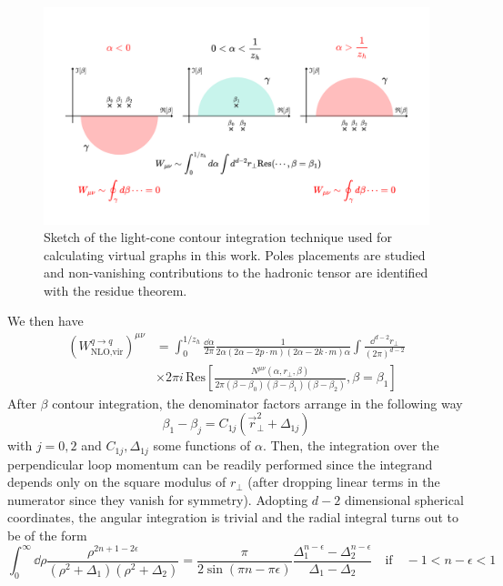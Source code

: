 \begin{figure}
    \centering
    \includegraphics[width=0.99\linewidth]{fig/beta contour.pdf}
    \caption{Sketch of the light-cone contour integration technique used for calculating virtual graphs in this work. Poles placements are studied and non-vanishing contributions to the hadronic tensor are identified with the residue theorem.}
    \label{fig:beta contour}
\end{figure}
We then have
\begin{equation}
\begin{aligned}
       (W^{q \to q}_{\text{NLO,vir}})^{\mu\nu} &=\int_0^{1/z_h}\frac{\dd \alpha}{2\pi} \frac{1}{2\alpha(2\alpha-2p \cdot m)(2\alpha-2 k \cdot m)\alpha}\int \frac{\dd^{d-2}r_\perp}{(2\pi)^{d-2}}\\
       &\times 2\pi i\,\mathrm{Res}\left[\frac{N^{\mu\nu}(\alpha,r_\perp,\beta)}{2\pi(\beta-\beta_0)(\beta-\beta_1)(\beta-\beta_2)},\beta=\beta_1\right]
\end{aligned}
\end{equation}
After $\beta$ contour integration, the denominator factors arrange in the following way
\begin{equation}\label{eq:betaimbetaj=C(rt2+Del)}
    \beta_1-\beta_j=C_{1j}(\vec r_\perp^2+\Delta_{1j})
\end{equation}
with $j=0,2$ and $C_{1j},\Delta_{1j}$ some functions of $\alpha$. Then, the integration over the perpendicular loop momentum can be readily performed since the integrand depends only on the square modulus of $r_\perp$ (after dropping linear terms in the numerator since they vanish for symmetry). Adopting $d-2$ dimensional spherical coordinates, the angular integration is trivial and the radial integral turns out to be of the form
\begin{equation}
    \int_0^\infty \dd \rho \frac{ \rho^{2n+1-2\epsilon}}{(\rho^2+\Delta_1)(\rho^2+\Delta_2)}=\frac{\pi}{2\sin(\pi n-\pi\epsilon)}\frac{\Delta_1^{n-\epsilon}-\Delta_2^{n-\epsilon}}{\Delta_1-\Delta_2}\quad \text{if} \quad -1<n-\epsilon<1
\end{equation}
